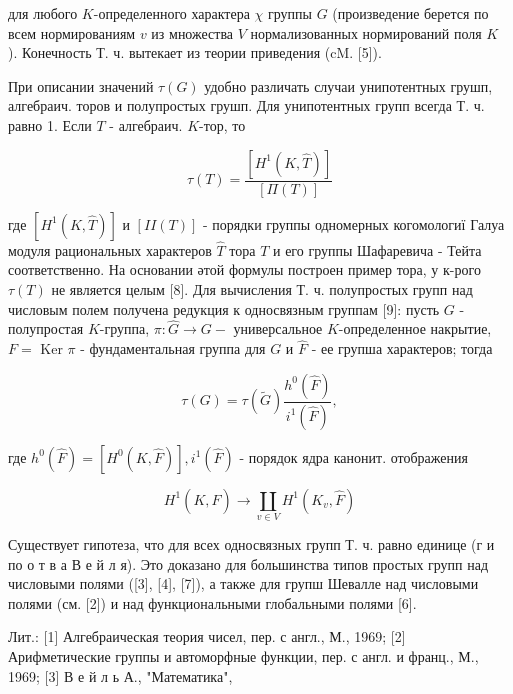 \documentclass[10pt]{article}
\begin{document}
для любого $K$-определенного характера $\chi$ группы $G$ (произведение берется по всем нормированиям $v$ из множества $V$ нормализованных нормирований поля $K$ ). Конечность Т. ч. вытекает из теории приведения (cM. [5]).



При описании значений $\tau(G)$ удобно различать случаи унипотентных грушп, алгебраич. торов и полупростых грушп. Для унипотентных групп всегда Т. ч. равно 1. Если $T$ - алгебраич. $K$-тор, то



\[

\tau(T)=\frac{\left[H^{1}(K, \widehat{T})\right]}{[\Pi(T)]}

\]



где $\left[H^{1}(K, \widehat{T})\right]$ и $[I I(T)]$ - порядки группы одномерных когомологиї Галуа модуля рациональных характеров $\hat{T}$ тора $T$ и его группы Шафаревича - Тейта соответственно. На основании әтой формулы построен пример тора, у к-рого $\tau(T)$ не является целым [8]. Для вычисления Т. ч. полупростых групп над числовым полем получена редукция к односвязным группам [9]: пусть $G$ - полупростая $K$-группа, $\pi: \widehat{G} \rightarrow G-$ универсальное $K$-определенное накрытие, $F=$ Ker $\pi$ - фундаментальная группа для $G$ и $\hat{F}$ - ее групша характеров; тогда



\[

\tau(G)=\tau(\tilde{G}) \frac{h^{0}(\widehat{F})}{i^{1}(\hat{F})},

\]



где $h^{0}(\widehat{F})=\left[H^{0}(K, \widehat{F})\right], i^{1}(\hat{F})$ - порядок ядра канонит. отображения



\[

H^{1}(K, \hat{F}) \rightarrow \coprod_{v \in V} H^{1}\left(K_{v}, \hat{F}\right)

\]



Существует гипотеза, что для всех односвязных групп Т. ч. равно единице (г и по о т в а В е й л я). Это доказано для большинства типов простых групп над числовыми полями ([3], [4], [7]), а также для групш Шевалле над числовыми полями (см. [2]) и над функциональными глобальными полями [6].



Лит.: [1] Алгебраическая теория чисел, пер. с англ., М., 1969; [2] Арифметические группы и автоморфные функции, пер. с англ. и франц., М., 1969; [3] В е й л ь А., "Математика",
\end{document}
